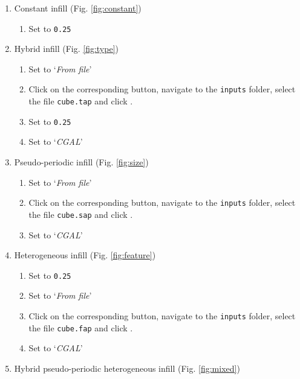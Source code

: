 \begin{enumerate}[label=\alph*)]
	\item Constant infill (Fig. \ref{fig:constant})
		\begin{enumerate}[label=\arabic*.]
			\item Set  to {\tt 0.25}
		\end{enumerate}	
	\item Hybrid infill (Fig. \ref{fig:type})
	\begin{enumerate}[label=\arabic*.]
		\item Set  to `\textit{From file}'
		\item Click on the corresponding  button, navigate to the \texttt{inputs} folder, select the file \texttt{cube.tap} and click  .
		\item Set  to {\tt 0.25}
		\item Set   to `\textit{CGAL}'
	\end{enumerate}
	\item Pseudo-periodic infill (Fig. \ref{fig:size})
	\begin{enumerate}[label=\arabic*.]
		\item Set  to `\textit{From file}'
		\item Click on the corresponding  button, navigate to the \texttt{inputs} folder, select the file \texttt{cube.sap} and click  .
		\item Set   to `\textit{CGAL}'
	\end{enumerate}
	\item Heterogeneous infill (Fig. \ref{fig:feature})
	\begin{enumerate}[label=\arabic*.]
		\item Set  to {\tt 0.25}
		\item Set  to `\textit{From file}'
		\item Click on the corresponding  button, navigate to the \texttt{inputs} folder, select the file \texttt{cube.fap} and click  .
		\item Set  to `\textit{CGAL}'
	\end{enumerate}
	\item Hybrid pseudo-periodic heterogeneous infill  (Fig. \ref{fig:mixed})

\end{enumerate}
